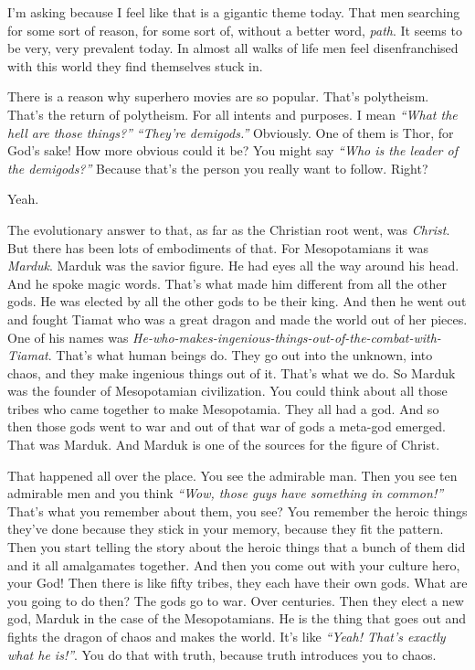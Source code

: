 \documentclass{memoir}
\newcommand{\qq}[1]{\emph{“#1”}}
\begin{document}
\begin{drama}
\jrspeaks I’m asking because I feel like that is a gigantic theme today. That men searching for some sort of reason, for some sort of, without a better word, \emph{path}. It seems to be very, very prevalent today. In almost all walks of life men feel disenfranchised with this world they find themselves stuck in.

\jpspeaks There is a reason why superhero movies are so popular. That’s polytheism. That’s the return of polytheism. For all intents and purposes. I mean \qq{What the hell are those things?} \qq{They’re demigods.} Obviously. One of them is Thor, for God’s sake! How more obvious could it be? You might say \qq{Who is the leader of the demigods?} Because that’s the person you really want to follow. Right?

\jrspeaks Yeah.

\jpspeaks The evolutionary answer to that, as far as the Christian root went, was \emph{Christ}. But there has been lots of embodiments of that. For Mesopotamians it was \emph{Marduk}. Marduk was the savior figure. He had eyes all the way around his head. And he spoke magic words. That’s what made him different from all the other gods. He was elected by all the other gods to be their king. And then he went out and fought Tiamat who was a great dragon and made the world out of her pieces. One of his names was \emph{He-who-makes-ingenious-things-out-of-the-combat-with-Tiamat}. That’s what human beings do. They go out into the unknown, into chaos, and they make ingenious things out of it. That’s what we do. So Marduk was the founder of Mesopotamian civilization. You could think about all those tribes who came together to make Mesopotamia. They all had a god. And so then those gods went to war and out of that war of gods a meta-god emerged. That was Marduk. And Marduk is one of the sources for the figure of Christ.

That happened all over the place. You see the admirable man. Then you see ten admirable men and you think \qq{Wow, those guys have something in common!} That’s what you remember about them, you see? You remember the heroic things they’ve done because they stick in your memory, because they fit the pattern. Then you start telling the story about the heroic things that a bunch of them did and it all amalgamates together. And then you come out with your culture hero, your God! Then there is like fifty tribes, they each have their own gods. What are you going to do then? The gods go to war. Over centuries. Then they elect a new god, Marduk in the case of the Mesopotamians. He is the thing that goes out and fights the dragon of chaos and makes the world. It’s like \qq{Yeah! That’s exactly what he is!}. You do that with truth, because truth introduces you to chaos.


\end{drama}
\end{document}
